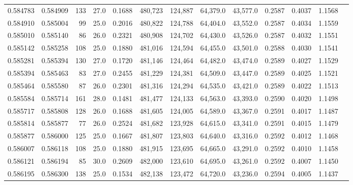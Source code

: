 \begin{tabular}{rrrrrrrrrrrrr}
0.584783 & 0.584909 &   133 & 27.0 &                                     0.1688 & 480,723 & 124,887 &  64,379.0 &  43,577.0 & 0.2587 & 0.4037 & 1.1568 \\
0.584910 & 0.585004 &    99 & 25.0 &                                     0.2016 & 480,822 & 124,788 &  64,404.0 &  43,552.0 & 0.2587 & 0.4034 & 1.1559 \\
0.585010 & 0.585140 &    86 & 26.0 &                                     0.2321 & 480,908 & 124,702 &  64,430.0 &  43,526.0 & 0.2587 & 0.4032 & 1.1551 \\
0.585142 & 0.585258 &   108 & 25.0 &                                     0.1880 & 481,016 & 124,594 &  64,455.0 &  43,501.0 & 0.2588 & 0.4030 & 1.1541 \\
0.585281 & 0.585394 &   130 & 27.0 &                                     0.1720 & 481,146 & 124,464 &  64,482.0 &  43,474.0 & 0.2589 & 0.4027 & 1.1529 \\
0.585394 & 0.585463 &    83 & 27.0 &                                     0.2455 & 481,229 & 124,381 &  64,509.0 &  43,447.0 & 0.2589 & 0.4025 & 1.1521 \\
0.585464 & 0.585580 &    87 & 26.0 &                                     0.2301 & 481,316 & 124,294 &  64,535.0 &  43,421.0 & 0.2589 & 0.4022 & 1.1513 \\
0.585584 & 0.585714 &   161 & 28.0 &                                     0.1481 & 481,477 & 124,133 &  64,563.0 &  43,393.0 & 0.2590 & 0.4020 & 1.1498 \\
0.585717 & 0.585808 &   128 & 26.0 &                                     0.1688 & 481,605 & 124,005 &  64,589.0 &  43,367.0 & 0.2591 & 0.4017 & 1.1487 \\
0.585814 & 0.585877 &    77 & 26.0 &                                     0.2524 & 481,682 & 123,928 &  64,615.0 &  43,341.0 & 0.2591 & 0.4015 & 1.1479 \\
0.585877 & 0.586000 &   125 & 25.0 &                                     0.1667 & 481,807 & 123,803 &  64,640.0 &  43,316.0 & 0.2592 & 0.4012 & 1.1468 \\
0.586007 & 0.586118 &   108 & 25.0 &                                     0.1880 & 481,915 & 123,695 &  64,665.0 &  43,291.0 & 0.2592 & 0.4010 & 1.1458 \\
0.586121 & 0.586194 &    85 & 30.0 &                                     0.2609 & 482,000 & 123,610 &  64,695.0 &  43,261.0 & 0.2592 & 0.4007 & 1.1450 \\
0.586195 & 0.586300 &   138 & 25.0 &                                     0.1534 & 482,138 & 123,472 &  64,720.0 &  43,236.0 & 0.2594 & 0.4005 & 1.1437 \\

\end{tabular}
